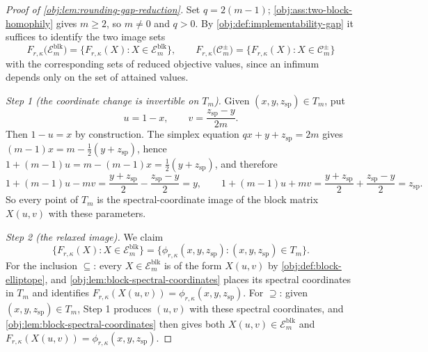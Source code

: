 \documentclass[11pt]{article}
\begin{document}
\begin{proof}[Proof of \cref{obj:lem:rounding-gap-reduction}]
Set \(q=2(m-1)\); \cref{obj:ass:two-block-homophily} gives \(m\ge2\), so \(m\ne0\) and \(q>0\).  By \cref{obj:def:implementability-gap} it suffices to identify the two image sets
\[
F_{r,\kappa}\bigl(\mathcal E_m^{\mathrm{blk}}\bigr)
=\bigl\{F_{r,\kappa}(X):X\in\mathcal E_m^{\mathrm{blk}}\bigr\},
\qquad
F_{r,\kappa}\bigl(\mathcal C_m^{\pm}\bigr)
=\bigl\{F_{r,\kappa}(X):X\in\mathcal C_m^{\pm}\bigr\}
\]
with the corresponding sets of reduced objective values, since an infimum depends only on the set of attained values.

\emph{Step 1 (the coordinate change is invertible on \(T_m\)).}  Given \((x,y,z_{\mathrm{sp}})\in T_m\), put
\[
u=1-x,
\qquad
v=\frac{z_{\mathrm{sp}}-y}{2m}.
\]
Then \(1-u=x\) by construction.  The simplex equation \(qx+y+z_{\mathrm{sp}}=2m\) gives \((m-1)x=m-\tfrac{1}{2}(y+z_{\mathrm{sp}})\), hence \(1+(m-1)u=m-(m-1)x=\tfrac12(y+z_{\mathrm{sp}})\), and therefore
\[
1+(m-1)u-mv=\frac{y+z_{\mathrm{sp}}}{2}-\frac{z_{\mathrm{sp}}-y}{2}=y,
\qquad
1+(m-1)u+mv=\frac{y+z_{\mathrm{sp}}}{2}+\frac{z_{\mathrm{sp}}-y}{2}=z_{\mathrm{sp}} .
\]
So every point of \(T_m\) is the spectral-coordinate image of the block matrix \(X(u,v)\) with these parameters. %

\emph{Step 2 (the relaxed image).}  We claim
\[
\bigl\{F_{r,\kappa}(X):X\in\mathcal E_m^{\mathrm{blk}}\bigr\}
=\bigl\{\phi_{r,\kappa}(x,y,z_{\mathrm{sp}}):(x,y,z_{\mathrm{sp}})\in T_m\bigr\}.
\]
For the inclusion \(\subseteq\): every \(X\in\mathcal E_m^{\mathrm{blk}}\) is of the form \(X(u,v)\) by \cref{obj:def:block-elliptope}, and \cref{obj:lem:block-spectral-coordinates} places its spectral coordinates in \(T_m\) and identifies \(F_{r,\kappa}(X(u,v))=\phi_{r,\kappa}(x,y,z_{\mathrm{sp}})\).  For \(\supseteq\): given \((x,y,z_{\mathrm{sp}})\in T_m\), Step 1 produces \((u,v)\) with these spectral coordinates, and \cref{obj:lem:block-spectral-coordinates} then gives both \(X(u,v)\in\mathcal E_m^{\mathrm{blk}}\) and \(F_{r,\kappa}(X(u,v))=\phi_{r,\kappa}(x,y,z_{\mathrm{sp}})\). %


\end{proof}
\end{document}
